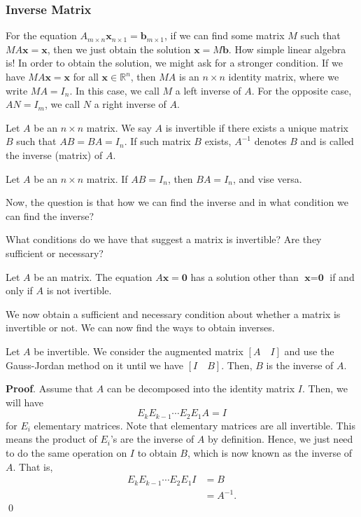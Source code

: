\documentclass[11pt]{article}
\theoremstyle{break}
\theoremstyle{no_label}
\newcommand{\bbR}{\mathbb{R}}
\newcommand{\bfzero}{\textbf{0}}
\newcommand{\bfb}{\textbf{b}}
\newcommand{\bfx}{\textbf{x}}
\numberwithin{equation}{section}
\begin{document}
\subsubsection*{Inverse Matrix}

For the equation $A_{m\times n}\bfx_{n\times 1}=\bfb_{m\times 1}$, if we can find some matrix $M$ such that $MA\bfx=\bfx$, then we just obtain the solution $\bfx=M\bfb$. How simple linear algebra is! In order to obtain the solution, we might ask for a stronger condition. If we have $MA\bfx=\bfx$ for all $\bfx\in\bbR^{n}$, then $MA$ is an $n\times n$ identity matrix, where we write $MA=I_n$. In this case, we call $M$ a left inverse of $A$. For the opposite case, $AN=I_m$, we call $N$ a right inverse of $A$.

\begin{definition}
    Let $A$ be an $n\times n$ matrix. We say $A$ is invertible if there exists a unique matrix $B$ such that $AB=BA=I_n$. If such matrix $B$ exists, $A^{-1}$ denotes $B$ and is called the inverse (matrix) of $A$.
\end{definition}

\begin{theorem}
    Let $A$ be an $n\times n$ matrix. If $AB=I_n$, then $BA=I_n$, and vise versa.
\end{theorem}

Now, the question is that how we can find the inverse and in what condition we can find the inverse?

\begin{question}
    What conditions do we have that suggest a matrix is invertible? Are they sufficient or necessary?
\end{question}

\begin{theorem}
    Let $A$ be an matrix. The equation $A\bfx=\bfzero$ has a solution other than $\bfx=\bfzero$ if and only if $A$ is not ivertible.
\end{theorem}

We now obtain a sufficient and necessary condition about whether a matrix is invertible or not. We can now find the ways to obtain inverses.

\begin{theorem}\label{theorem of Gauss-Jordan for inverse}
    Let $A$ be invertible. We consider the augmented matrix $[A\quad I]$ and use the Gauss-Jordan method on it until we have $[I\quad B]$. Then, $B$ is the inverse of $A$.
\end{theorem}
\textbf{Proof}. Assume that $A$ can be decomposed into the identity matrix $I$. Then, we will have $$E_kE_{k-1}\cdots E_2 E_1 A=I$$ for $E_i$ elementary matrices. Note that elementary matrices are all invertible. This means the product of $E_i$'s are the inverse of $A$ by definition. Hence, we just need to do the same operation on $I$ to obtain $B$, which is now known as the inverse of $A$. That is, \begin{align*}
    E_kE_{k-1}\cdots E_2 E_1I&=B\\
    &=A^{-1}.
\end{align*} \qed
\end{document}
